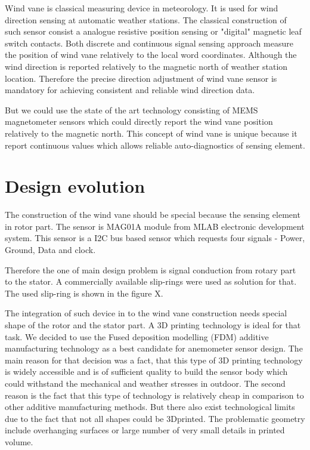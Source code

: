 \documentclass{poster16}
\begin{document}
Wind vane is classical measuring device in meteorology. It is used for wind direction sensing at automatic weather stations. The classical construction of such sensor consist a analogue resistive position sensing or "digital" magnetic leaf switch contacts. Both discrete and continuous signal sensing approach measure the position of wind vane relatively to the local word coordinates. Although the wind direction is reported relatively to the magnetic north of weather station location. Therefore the precise direction adjustment of wind vane sensor is mandatory for achieving consistent and reliable wind direction data.

But we could use the state of the art technology consisting of MEMS magnetometer sensors which could directly report the wind vane position relatively to the magnetic north. This concept of wind vane is unique because it report continuous values which allows reliable auto-diagnostics of sensing element. 

\section{Design evolution}

The construction of the wind vane should be special because the sensing element in rotor part. The sensor is MAG01A module from MLAB electronic development system. This sensor is a I2C bus based sensor which requests four signals - Power, Ground, Data and clock. 

Therefore the one of main design problem is signal conduction from rotary part to the stator. A commercially available slip-rings were used as solution for that. 
The used slip-ring is shown in the figure X. 


The integration of such device in to the wind vane construction needs special shape of the rotor and the stator part. A 3D printing technology is ideal for that task. We decided to use the Fused deposition modelling (FDM) additive manufacturing technology as a best candidate for anemometer sensor design. The main reason for that decision was a fact, that this type of 3D printing technology is widely accessible and is of sufficient quality to build the sensor body which could withstand the mechanical and weather stresses in outdoor. The second reason is the fact that this type of technology is relatively  cheap in comparison to other additive manufacturing methods. 
But there also exist technological limits due to the fact that not all shapes could be 3Dprinted. The problematic geometry include overhanging surfaces or large number of very small details in printed volume. 
\end{document}
